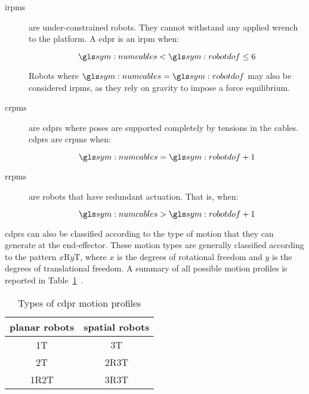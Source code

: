         \begin{description}

            \item[\glspl{irpm}]

				are under-constrained robots.  They cannot withstand any applied
				wrench to the platform.  A \gls{cdpr}  is  an  \gls{irpm}  when:

                \begin{equation}
                    \numcables < \robotdof \leq 6
                \end{equation}

				Robots where $\numcables = \robotdof$  may	also  be  considered
				\glspl{irpm},  as  they  rely  on  gravity	to	impose	a  force
                equilibrium.

            \item[\glspl{crpm}]

				are  \glspl{cdpr}  where  poses  are  supported  completely   by
				tensions in the cables.   \glspl{cdpr}	are  \glspl{crpm}  when:

                \begin{equation}
                    \numcables = \robotdof + 1
                \end{equation}

            \item[\glspl{rrpm}]

				are robots	that  have	redundant  actuation.	That  is,  when:

                \begin{equation}
                    \numcables > \robotdof + 1
                \end{equation}
        \end{description}

		\glspl{cdpr} can also be classified according to the type of motion that
		they can generate at the end-effector.	These motion types are generally
		classified according to the pattern $x$R$y$T, where $x$ is	the  degrees
		of rotational freedom and $y$ is the degrees of translational freedom. A
		summary   of   all	 possible	motion	 profiles	is	  reported	  in
		Table~\ref{tab:types_of_cdpr_motion_profiles}~\cite{bib:cdpr:cable_driven_parallel_robots_theory_and_application}.

        \begin{table}[ht]
            \centering
            \begin{tabular}{c c}
                \toprule
                planar robots & spatial robots \\
                \midrule
                1T          &   3T \\
                2T          &   2R3T \\
                1R2T        &   3R3T
            \end{tabular}
            \caption{Types of \gls{cdpr} motion profiles}%
            \label{tab:types_of_cdpr_motion_profiles}
        \end{table}


